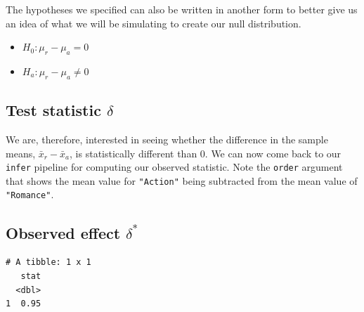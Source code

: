 \documentclass[12pt, krantz2,]{krantz}
\makeatletter
\newenvironment{Shaded}{\begin{snugshade}}{\end{snugshade}}
\newcommand{\DataTypeTok}[1]{\textcolor[rgb]{0.27,0.27,0.27}{#1}}
\newcommand{\KeywordTok}[1]{\textcolor[rgb]{0.27,0.27,0.27}{\textbf{#1}}}
\newcommand{\NormalTok}[1]{#1}
\newcommand{\OperatorTok}[1]{\textcolor[rgb]{0.43,0.43,0.43}{\textbf{#1}}}
\newcommand{\StringTok}[1]{\textcolor[rgb]{0.5,0.5,0.5}{#1}}
\providecommand{\tightlist}{%
  \setlength{\itemsep}{0pt}\setlength{\parskip}{0pt}}
\newenvironment{kframe}{%
\medskip{}
\setlength{\fboxsep}{.8em}
 \def\at@end@of@kframe{}%
 \ifinner\ifhmode%
  \def\at@end@of@kframe{\end{minipage}}%
  \begin{minipage}{\columnwidth}%
 \fi\fi%
 \def\FrameCommand##1{\hskip\@totalleftmargin \hskip-\fboxsep
 \colorbox{shadecolor}{##1}\hskip-\fboxsep
     \hskip-\linewidth \hskip-\@totalleftmargin \hskip\columnwidth}%
 \MakeFramed {\advance\hsize-\width
   \@totalleftmargin\z@ \linewidth\hsize
   \@setminipage}}%
 {\par\unskip\endMakeFramed%
 \at@end@of@kframe}
\renewenvironment{Shaded}{\begin{kframe}}{\end{kframe}}
\makeatother
\begin{document}
The hypotheses we specified can also be written in another form to better give us an idea of what we will be simulating to create our null distribution.

\begin{itemize}
\tightlist
\item
  \(H_0: \mu_r - \mu_a = 0\)
\item
  \(H_a: \mu_r - \mu_a \ne 0\)
\end{itemize}

\hypertarget{test-statistic-delta}{%
\subsection{\texorpdfstring{Test statistic \(\delta\)}{Test statistic \textbackslash{}delta}}\label{test-statistic-delta}}

We are, therefore, interested in seeing whether the difference in the sample means, \(\bar{x}_r - \bar{x}_a\), is statistically different than 0. We can now come back to our \texttt{infer} pipeline for computing our observed statistic. Note the \texttt{order} argument that shows the mean value for \texttt{"Action"} being subtracted from the mean value of \texttt{"Romance"}.

\hypertarget{observed-effect-delta}{%
\subsection{\texorpdfstring{Observed effect \(\delta^*\)}{Observed effect \textbackslash{}delta\^{}*}}\label{observed-effect-delta}}

\begin{Shaded}
\end{Shaded}

\begin{verbatim}
# A tibble: 1 x 1
   stat
  <dbl>
1  0.95
\end{verbatim}
\end{document}
